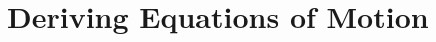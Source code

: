 \documentclass[12pt]{article}
\begin{document}
	
	
	
	\newpage
	
	\section{Deriving Equations of Motion}
	
\end{document}
